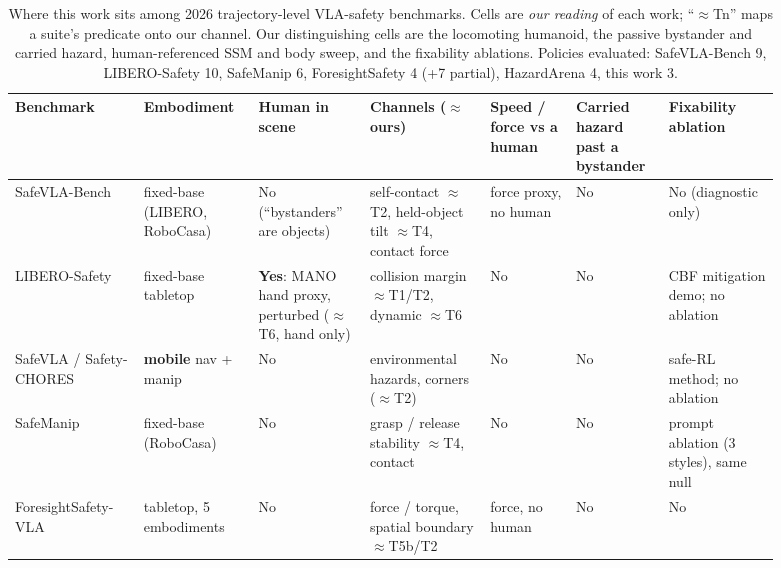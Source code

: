 \documentclass{article}
\begin{document}
\begin{table}[H]
\centering\scriptsize\setlength{\tabcolsep}{3pt}
\caption{Where this work sits among 2026 trajectory-level VLA-safety benchmarks. Cells are \emph{our reading} of each work; ``$\approx$Tn'' maps a suite's predicate onto our channel. Our distinguishing cells are the locomoting humanoid, the passive bystander and carried hazard, human-referenced SSM and body sweep, and the fixability ablations. Policies evaluated: SafeVLA-Bench 9, LIBERO-Safety 10, SafeManip 6, ForesightSafety 4 (+7 partial), HazardArena 4, this work 3.}
\label{tab:I}
\vspace{4pt}
\begin{tabular}{@{}>{\raggedright\arraybackslash}p{0.150\linewidth}>{\raggedright\arraybackslash}p{0.116\linewidth}>{\raggedright\arraybackslash}p{0.133\linewidth}>{\raggedright\arraybackslash}p{0.141\linewidth}>{\raggedright\arraybackslash}p{0.108\linewidth}>{\raggedright\arraybackslash}p{0.108\linewidth}>{\raggedright\arraybackslash}p{0.133\linewidth}@{}}
\toprule
Benchmark & Embodiment & Human in scene & Channels ($\approx$ ours) & Speed / force vs a human & Carried hazard past a bystander & Fixability ablation \\
\midrule
SafeVLA-Bench\newline \citep{ref27} & fixed-base (LIBERO, RoboCasa) & No (``bystanders'' are objects) & self-contact $\approx$T2, held-object tilt $\approx$T4, contact force & force proxy, no human & No & No (diagnostic only) \\
LIBERO-Safety\newline \citep{ref24} & fixed-base tabletop & \textbf{Yes}: MANO hand proxy, perturbed ($\approx$T6, hand only) & collision margin $\approx$T1/T2, dynamic $\approx$T6 & No & No & CBF mitigation demo; no ablation \\
SafeVLA / Safety-CHORES\newline \citep{ref21} & \textbf{mobile} nav + manip & No & environmental hazards, corners ($\approx$T2) & No & No & safe-RL method; no ablation \\
SafeManip\newline \citep{ref30} & fixed-base (RoboCasa) & No & grasp / release stability $\approx$T4, contact & No & No & prompt ablation (3 styles), same null \\
ForesightSafety-VLA\newline \citep{ref23} & tabletop, 5 embodiments & No & force / torque, spatial boundary $\approx$T5b/T2 & force, no human & No & No \\

\end{tabular}
\end{table}
\end{document}

